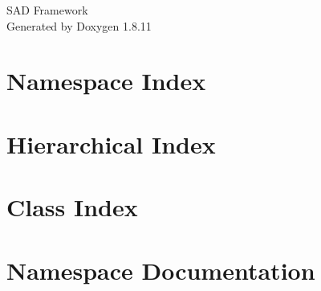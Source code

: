\documentclass[twoside]{book}
\newcommand{\+}{\discretionary{\mbox{\scriptsize$\hookleftarrow$}}{}{}}
\newcommand{\clearemptydoublepage}{%
  \newpage{\pagestyle{empty}\cleardoublepage}%
}
\begin{document}
\hypersetup{pageanchor=false,
             bookmarksnumbered=true,
             pdfencoding=unicode
            }
\begin{titlepage}
\vspace*{7cm}
\begin{center}%
{\Large S\+AD Framework }\\
\vspace*{1cm}
{\large Generated by Doxygen 1.8.11}\\
\end{center}
\end{titlepage}
\clearemptydoublepage
\tableofcontents
\clearemptydoublepage
{}
\hypersetup{pageanchor=true}

\chapter{Namespace Index}

\chapter{Hierarchical Index}

\chapter{Class Index}

\chapter{Namespace Documentation}


















\end{document}
